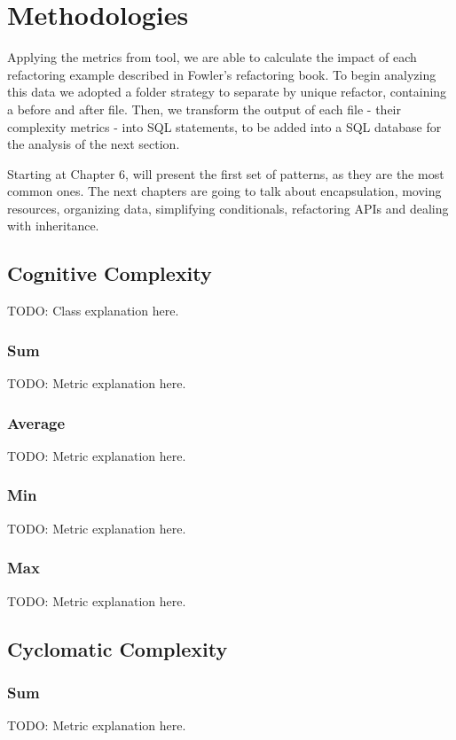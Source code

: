 \section{Methodologies}

Applying the metrics from \cite{article:mozilla} tool, we are able to calculate the impact of each refactoring example
described in Fowler's refactoring book. To begin analyzing this data we adopted a folder strategy to separate by unique refactor,
containing a before and after file. Then, we transform the output of each file - their complexity metrics - into SQL statements,
to be added into a SQL database for the analysis of the next section.

Starting at Chapter 6, \cite{book:refactoring} will present the first set of patterns, as they are the most common ones.
The next chapters are going to talk about encapsulation, moving resources, organizing data, simplifying conditionals,
refactoring APIs and dealing with inheritance.

\subsection{Cognitive Complexity}
TODO: Class explanation here.

\subsubsection{Sum}
TODO: Metric explanation here.

\subsubsection{Average}
TODO: Metric explanation here.

\subsubsection{Min}
TODO: Metric explanation here.

\subsubsection{Max}
TODO: Metric explanation here.

\subsection{Cyclomatic Complexity}

\subsubsection{Sum}
TODO: Metric explanation here.

